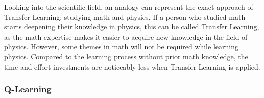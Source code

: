 Looking into the scientific field, an analogy can represent the exact approach of Transfer Learning: studying math and physics. If a person who studied math starts deepening their knowledge in physics, this can be called Transfer Learning, as the math expertise makes it easier to acquire new knowledge in the field of physics. However, some themes in math will not be required while learning physics. Compared to the learning process without prior math knowledge, the time and effort investments are noticeably less when Transfer Learning is applied.

\subsubsection{Q-Learning}\label{ssec:subsubsec_2.2.1}




